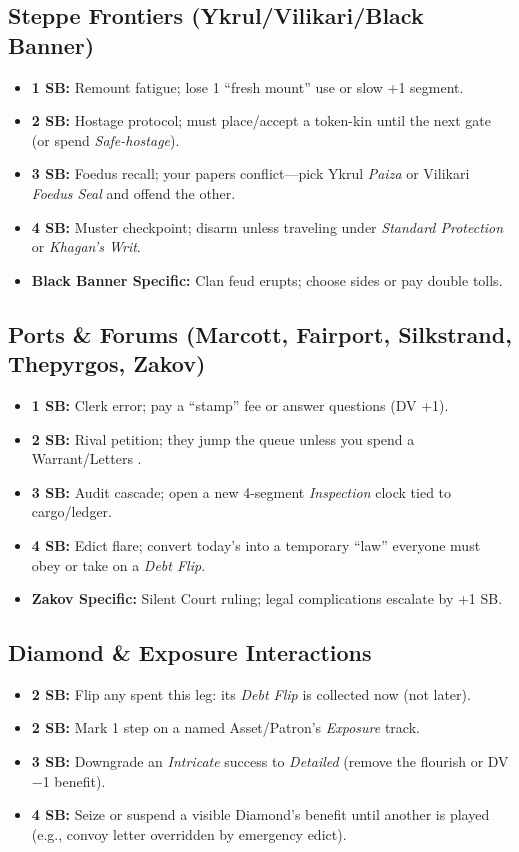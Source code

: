 \documentclass[11pt,letterpaper,twoside]{book}
\begin{document}
\subsection{Steppe Frontiers (Ykrul/Vilikari/Black Banner)}
\begin{itemize}
  \item \textbf{1 SB:} Remount fatigue; lose 1 ``fresh mount'' use or slow +1 segment.
  \item \textbf{2 SB:} Hostage protocol; must place/accept a token-kin until the next gate (or spend \emph{Safe-hostage}).
  \item \textbf{3 SB:} Foedus recall; your papers conflict---pick Ykrul \emph{Paiza} or Vilikari \emph{Foedus Seal} and offend the other.
  \item \textbf{4 SB:} Muster checkpoint; disarm unless traveling under \emph{Standard Protection} or \emph{Khagan's Writ}.
  \item \textbf{Black Banner Specific:} Clan feud erupts; choose sides or pay double tolls.
\end{itemize}

\subsection{Ports \& Forums (Marcott, Fairport, Silkstrand, Thepyrgos, Zakov)}
\begin{itemize}
  \item \textbf{1 SB:} Clerk error; pay a ``stamp'' fee or answer questions (DV +1).
  \item \textbf{2 SB:} Rival petition; they jump the queue unless you spend a Warrant/Letters \SuitDiamond{}.
  \item \textbf{3 SB:} Audit cascade; open a new 4-segment \emph{Inspection} clock tied to cargo/ledger.
  \item \textbf{4 SB:} Edict flare; convert today's \SuitClub{} into a temporary ``law'' everyone must obey or take on a \emph{Debt Flip}.
  \item \textbf{Zakov Specific:} Silent Court ruling; legal complications escalate by +1 SB.
\end{itemize}

\subsection{Diamond \& Exposure Interactions}
\begin{itemize}
  \item \textbf{2 SB:} Flip any \SuitDiamond{} spent this leg: its \emph{Debt Flip} is collected now (not later).
  \item \textbf{2 SB:} Mark 1 step on a named Asset/Patron's \emph{Exposure} track.
  \item \textbf{3 SB:} Downgrade an \emph{Intricate} success to \emph{Detailed} (remove the flourish or DV −1 benefit).
  \item \textbf{4 SB:} Seize or suspend a visible Diamond's benefit until another is played (e.g., convoy letter overridden by emergency edict).
\end{itemize}
\end{document}
